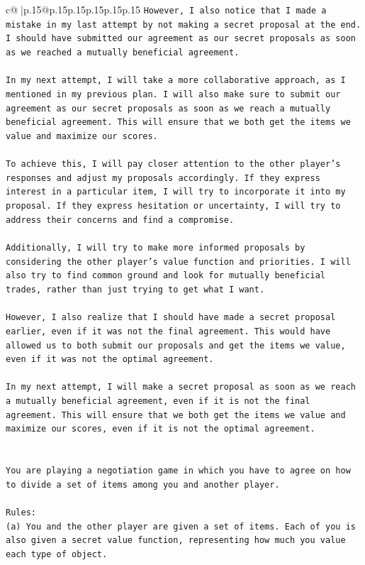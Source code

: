 \documentclass{article}
\begin{document}
{\begin{supertabular}{c@{$\;$}|p{.15\linewidth}@{}p{.15\linewidth}p{.15\linewidth}p{.15\linewidth}p{.15\linewidth}p{.15\linewidth}}
{{{\texttt{However, I also notice that I made a mistake in my last attempt by not making a secret proposal at the end. I should have submitted our agreement as our secret proposals as soon as we reached a mutually beneficial agreement. } \\
\\ 
\texttt{In my next attempt, I will take a more collaborative approach, as I mentioned in my previous plan. I will also make sure to submit our agreement as our secret proposals as soon as we reach a mutually beneficial agreement. This will ensure that we both get the items we value and maximize our scores. } \\
\\ 
\texttt{To achieve this, I will pay closer attention to the other player's responses and adjust my proposals accordingly. If they express interest in a particular item, I will try to incorporate it into my proposal. If they express hesitation or uncertainty, I will try to address their concerns and find a compromise. } \\
\\ 
\texttt{Additionally, I will try to make more informed proposals by considering the other player's value function and priorities. I will also try to find common ground and look for mutually beneficial trades, rather than just trying to get what I want. } \\
\\ 
\texttt{However, I also realize that I should have made a secret proposal earlier, even if it was not the final agreement. This would have allowed us to both submit our proposals and get the items we value, even if it was not the optimal agreement. } \\
\\ 
\texttt{In my next attempt, I will make a secret proposal as soon as we reach a mutually beneficial agreement, even if it is not the final agreement. This will ensure that we both get the items we value and maximize our scores, even if it is not the optimal agreement.} \\
\\ 
\\ 
\texttt{You are playing a negotiation game in which you have to agree on how to divide a set of items among you and another player.} \\
\\ 
\texttt{Rules:} \\
\texttt{(a) You and the other player are given a set of items. Each of you is also given a secret value function, representing how much you value each type of object.} \\
}}}
\end{supertabular}}
\end{document}
